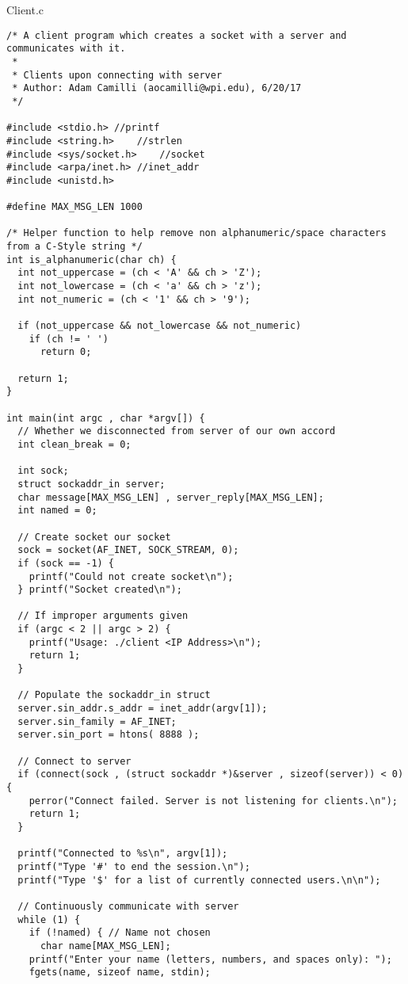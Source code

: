\documentclass[titlepage, 14pt]{article}
\begin{document}
\begin{center}
  Client.c
\end{center}
\begin{verbatim}
/* A client program which creates a socket with a server and communicates with it.
 *
 * Clients upon connecting with server 
 * Author: Adam Camilli (aocamilli@wpi.edu), 6/20/17
 */

#include <stdio.h> //printf
#include <string.h>    //strlen
#include <sys/socket.h>    //socket
#include <arpa/inet.h> //inet_addr
#include <unistd.h>

#define MAX_MSG_LEN 1000

/* Helper function to help remove non alphanumeric/space characters from a C-Style string */
int is_alphanumeric(char ch) {
  int not_uppercase = (ch < 'A' && ch > 'Z');
  int not_lowercase = (ch < 'a' && ch > 'z');
  int not_numeric = (ch < '1' && ch > '9');

  if (not_uppercase && not_lowercase && not_numeric)
    if (ch != ' ')
      return 0;
  
  return 1;
}

int main(int argc , char *argv[]) {
  // Whether we disconnected from server of our own accord
  int clean_break = 0;
  
  int sock;
  struct sockaddr_in server;
  char message[MAX_MSG_LEN] , server_reply[MAX_MSG_LEN];
  int named = 0;
  
  // Create socket our socket
  sock = socket(AF_INET, SOCK_STREAM, 0);
  if (sock == -1) {
    printf("Could not create socket\n");
  } printf("Socket created\n");

  // If improper arguments given
  if (argc < 2 || argc > 2) {
    printf("Usage: ./client <IP Address>\n");
    return 1;
  }

  // Populate the sockaddr_in struct
  server.sin_addr.s_addr = inet_addr(argv[1]);
  server.sin_family = AF_INET;
  server.sin_port = htons( 8888 );
  
  // Connect to server
  if (connect(sock , (struct sockaddr *)&server , sizeof(server)) < 0) {
    perror("Connect failed. Server is not listening for clients.\n");
    return 1;
  }
  
  printf("Connected to %s\n", argv[1]);
  printf("Type '#' to end the session.\n");
  printf("Type '$' for a list of currently connected users.\n\n");

  // Continuously communicate with server
  while (1) {      
    if (!named) { // Name not chosen
      char name[MAX_MSG_LEN];
	printf("Enter your name (letters, numbers, and spaces only): ");
	fgets(name, sizeof name, stdin);


\end{verbatim}
\end{document}
